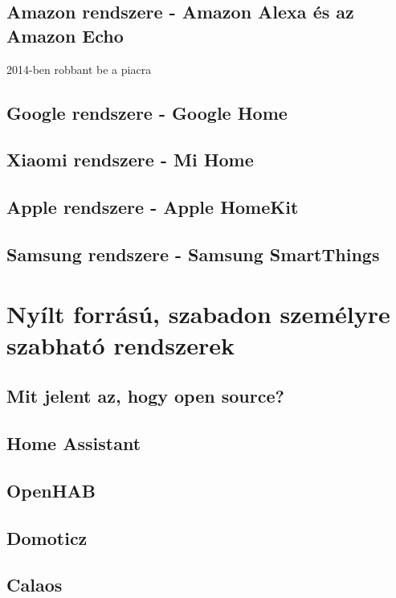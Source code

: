 \documentclass[
]{thesis-ekf}
\theoremstyle{definition}
\theoremstyle{remark}
\begin{document}
	\subsection*{Amazon rendszere - Amazon Alexa és az Amazon Echo}
	2014-ben robbant be a piacra 
	\subsection*{Google rendszere - Google Home}
	
	\subsection*{Xiaomi rendszere - Mi Home}
	
	\subsection*{Apple rendszere - Apple HomeKit}
	
	\subsection*{Samsung rendszere - Samsung SmartThings}
	
	\section{Nyílt forrású, szabadon személyre szabható rendszerek}
	\subsection*{Mit jelent az, hogy open source?}
	
	\subsection*{Home Assistant}
	
	\subsection*{OpenHAB}
	
	\subsection*{Domoticz}
	
	\subsection*{Calaos}
\end{document}
